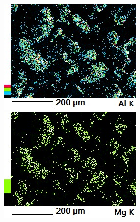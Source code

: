 \documentclass[14pt]{extarticle}
\begin{document}
\begin{figure}[H]
	\includegraphics[width = 0.45\linewidth]{./pictures/map1_Al_K.jpg}\hspace{4.2em}%
	\includegraphics[width = 0.45\linewidth]{./pictures/map1_Mg_K.jpg} \hspace{1em}%
\end{figure}
\end{document}

